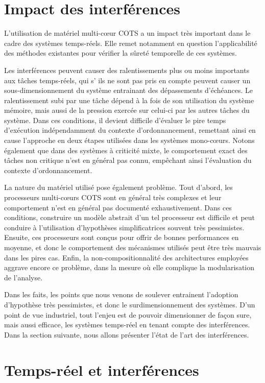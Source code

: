 \section{\label{section:impact-interferences-wcet}Impact des interférences}

L'utilisation de matériel multi-cœur COTS a un impact très important dans le cadre des systèmes temps-réels.
Elle remet notamment en question l'applicabilité des méthodes existantes pour vérifier la sûreté temporelle de ces systèmes.

Les interférences peuvent causer des ralentissements plus ou moins importants aux tâches temps-réels, qui s’ ils ne sont pas pris en compte peuvent causer un sous-dimensionnement du système entrainant des dépassements d'échéances.
Le ralentissement subi par une tâche dépend à la fois de son utilisation du système mémoire, mais aussi de la pression exercée sur celui-ci par les autres tâches du système.
Dans ces conditions, il devient  difficile d'évaluer le pire temps d'exécution indépendamment du contexte d'ordonnancement, remettant ainsi en cause l'approche en deux étapes utilisées dans les systèmes mono-cœurs.
Notons également que dans des systèmes à criticité mixte, le comportement exact des tâches non critique n'est en général pas connu, empêchant ainsi l'évaluation du contexte d'ordonnancement.

La nature du matériel utilisé pose également problème.
Tout d'abord, les processeurs multi-cœurs COTS sont en général très complexes et leur comportement n'est en général pas documenté exhaustivement.
Dans ces conditions, construire un modèle abstrait d'un tel processeur est difficile et peut conduire à l'utilisation d'hypothèses simplificatrices souvent très pessimistes.
Ensuite, ces processeurs sont conçus pour offrir de bonnes performances en moyenne, et donc le comportement des mécanismes utilisés peut être très mauvais dans les pires cas.
Enfin, la non-compositionnalité des architectures employées aggrave encore ce problème, dans la mesure où elle complique la modularisation de l'analyse.

Dans les faits, les points que nous venons de soulever entrainent l'adoption d'hypothèse très pessimistes, et donc le surdimensionnement des systèmes.
D'un point de vue industriel, tout l'enjeu est de pouvoir dimensionner de façon sure, mais aussi efficace, les systèmes temps-réel en tenant compte des interférences.
Dans la section suivante, nous allons présenter l'état de l'art des interférences.

\section{Temps-réel et interférences}


